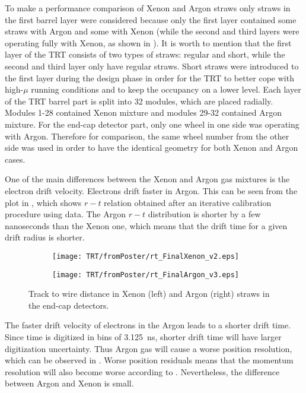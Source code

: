 To make a performance comparison of Xenon and Argon straws 
only straws in the first barrel layer were considered because only the first layer contained some straws with Argon and some with Xenon 
(while the second and third layers were operating fully with Xenon, as shown in ).
It is worth to mention that the first layer of the TRT consists of two types of straws: regular and short, while the second and third layer only have regular straws.
Short straws were introduced to the first layer during the design phase in order for the TRT to
better cope with high-$\mu$ running conditions and to keep the occupancy on a lower level.
Each layer of the TRT barrel part is split into 32 modules, which are placed radially. 
Modules 1-28 contained Xenon mixture and modules 29-32 contained Argon mixture.
For the end-cap detector part, only one wheel in one side was operating with Argon. Therefore for comparison, the same wheel number from the other side was used in order
to have the identical geometry for both Xenon and Argon cases.

One of the main differences between the Xenon and Argon gas mixtures is the electron drift velocity. Electrons drift faster in Argon. 
This can be seen from the plot in , 
which shows $r-t$ relation obtained after an iterative calibration procedure using data.
The Argon $r-t$ distribution is shorter by a few nanoseconds than the Xenon one, which means that the drift time for a given drift radius is shorter.

\begin{figure}
\begin{subfigure}{.5\textwidth}
  \centering
  \texttt{[image: TRT/fromPoster/rt\_FinalXenon\_v2.eps]}
\end{subfigure}%
\begin{subfigure}{.5\textwidth}
  \centering
  \texttt{[image: TRT/fromPoster/rt\_FinalArgon\_v3.eps]}
\end{subfigure}

\caption{Track to wire distance in Xenon (left) and Argon (right) straws in the end-cap detectors.}
  \label{fig:RT_xenon_argon}
\end{figure}

The faster drift velocity of electrons in the Argon leads to a shorter drift time. Since time is digitized in bins of 3.125~ns, shorter drift time will have larger digitization uncertainty. Thus Argon gas will cause a worse position resolution, which can be observed in . Worse position residuals means that the momentum resolution will also become worse according to
. Nevertheless, the difference between Argon and Xenon is small.

